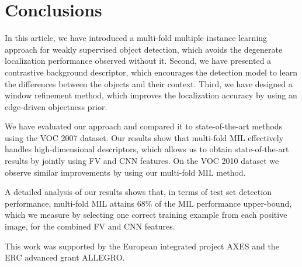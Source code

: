 \documentclass[10pt,journal,cspaper,final,twocolumn,compsoc]{./IEEEtran}
\begin{document}
\section{Conclusions}\label{sec:conclusion}

In this article, we have introduced a multi-fold multiple instance learning
approach for weakly supervised object detection, which
avoids the degenerate localization performance observed
without it.  Second, we have presented a contrastive background
descriptor, which encourages the detection model to learn
the differences between the objects and their context.
Third, we have designed a window refinement method, which
improves the localization accuracy by using an
edge-driven objectness prior.

We have evaluated our approach and compared it to
state-of-the-art methods using the VOC 2007 dataset.  Our
results show that multi-fold MIL effectively handles
high-dimensional descriptors, which allows us to obtain
state-of-the-art results by jointly using FV and
CNN features. On the VOC 2010 dataset we observe
similar improvements by using our multi-fold MIL
method.

A detailed analysis of our results shows that, in terms of
test set detection performance, multi-fold MIL attains
68\% of the MIL performance upper-bound, which we measure 
by selecting one correct training example from each positive 
image, for the combined FV and CNN features.

\smallskip{} This work was supported by the
European integrated project AXES and the ERC advanced grant ALLEGRO. 





\end{document}
